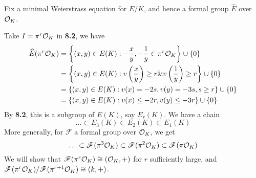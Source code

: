 \documentclass[10pt,a4paper]{article}
\begin{document}
Fix a minimal Weierstrass equation for $E/K$, and hence a formal group $\hat{E}$ over $\mathcal{O}_K$.

Take $I = \pi^r \mathcal{O}_K$ in \textbf{8.2}, we have
\begin{align*}
  \widehat{E}(\pi^r\mathcal{O}_K) &= \left\{(x,y) \in E(K) : -\frac{x}{y}, -\frac{1}{y} \in \pi^r \mathcal{O}_K\right\} \cup \{0\}\\
  &= \left\{(x,y) \in E(K) : v\left(\frac{x}{y}\right)\geq r \& v\left(\frac{1}{y}\right) \geq r\right\}\cup\{0\}\\
  &= \left\{(x,y) \in E(K) : v(x) = -2s, v(y)=-3s, s \geq r\right\}\cup\{0\}\\
  &= \left\{(x,y) \in E(K) : v(x) \leq -2r, v(y)\leq -3r\right\}\cup\{0\}
\end{align*}
By \textbf{8.2}, this is a subgroup of $E(K)$, say $E_r(K)$. We have a chain
\[\ldots \subset E_3(K) \subset E_2(K) \subset E_1(K)\]
More generally, for $\mathscr{F}$ a formal group over $\mathcal{O}_K$, we get
\[\ldots \subset \mathscr{F}(\pi^3\mathcal{O}_K) \subset \mathscr{F}(\pi^2\mathcal{O}_K) \subset \mathscr{F}(\pi\mathcal{O}_K)\]
We will show that $\mathscr{F}(\pi^r \mathcal{O}_K) \cong (\mathcal{O}_K, +)$ for $r$ sufficiently large, and $\mathscr{F}(\pi^r \mathcal{O}_K)/\mathscr{F}(\pi^{r+1}\mathcal{O}_K) \cong (k, +)$.
\end{document}

